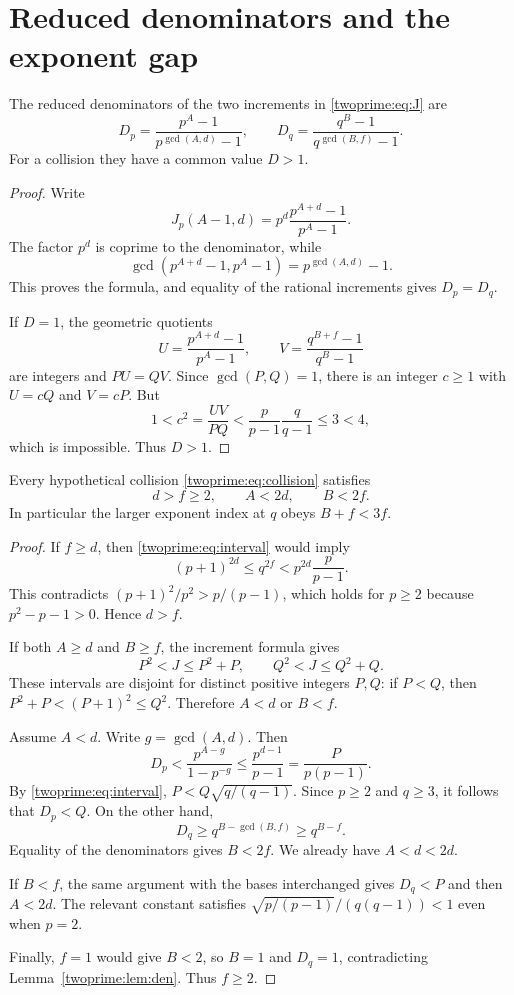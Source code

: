 \section{Reduced denominators and the exponent gap}
\begin{lemma}\label{twoprime:lem:den}
The reduced denominators of the two increments in \eqref{twoprime:eq:J} are
\[
 D_p=\frac{p^A-1}{p^{\gcd(A,d)}-1},\qquad
 D_q=\frac{q^B-1}{q^{\gcd(B,f)}-1}.
\]
For a collision they have a common value $D>1$.
\end{lemma}
\begin{proof}
Write
\[
 J_p(A-1,d)=p^d\frac{p^{A+d}-1}{p^A-1}.
\]
The factor $p^d$ is coprime to the denominator, while
\[
 \gcd(p^{A+d}-1,p^A-1)=p^{\gcd(A,d)}-1.
\]
This proves the formula, and equality of the rational increments gives $D_p=D_q$.

If $D=1$, the geometric quotients
\[
 U=\frac{p^{A+d}-1}{p^A-1},\qquad
 V=\frac{q^{B+f}-1}{q^B-1}
\]
are integers and $PU=QV$. Since $\gcd(P,Q)=1$, there is an integer $c\ge1$ with $U=cQ$ and $V=cP$. But
\[
 1<c^2=\frac{UV}{PQ}
 <\frac p{p-1}\frac q{q-1}\le3<4,
\]
which is impossible. Thus $D>1$.
\end{proof}

\begin{lemma}\label{twoprime:lem:gap}
Every hypothetical collision \eqref{twoprime:eq:collision} satisfies
\[
 \boxed{d>f\ge2,\qquad A<2d,\qquad B<2f.}
\]
In particular the larger exponent index at $q$ obeys $B+f<3f$.
\end{lemma}
\begin{proof}
If $f\ge d$, then \eqref{twoprime:eq:interval} would imply
\[
 (p+1)^{2d}\le q^{2f}<p^{2d}\frac p{p-1}.
\]
This contradicts $(p+1)^2/p^2>p/(p-1)$, which holds for $p\ge2$ because $p^2-p-1>0$. Hence $d>f$.

If both $A\ge d$ and $B\ge f$, the increment formula gives
\[
 P^2<J\le P^2+P,\qquad Q^2<J\le Q^2+Q.
\]
These intervals are disjoint for distinct positive integers $P,Q$: if $P<Q$, then $P^2+P<(P+1)^2\le Q^2$. Therefore $A<d$ or $B<f$.

Assume $A<d$. Write $g=\gcd(A,d)$. Then
\[
 D_p<\frac{p^{A-g}}{1-p^{-g}}
 \le\frac{p^{d-1}}{p-1}=\frac{P}{p(p-1)}.
\]
By \eqref{twoprime:eq:interval}, $P<Q\sqrt{q/(q-1)}$. Since $p\ge2$ and $q\ge3$, it follows that $D_p<Q$. On the other hand,
\[
 D_q\ge q^{B-\gcd(B,f)}\ge q^{B-f}.
\]
Equality of the denominators gives $B<2f$. We already have $A<d<2d$.

If $B<f$, the same argument with the bases interchanged gives $D_q<P$ and then $A<2d$. The relevant constant satisfies $\sqrt{p/(p-1)}/(q(q-1))<1$ even when $p=2$.

Finally, $f=1$ would give $B<2$, so $B=1$ and $D_q=1$, contradicting Lemma~\ref{twoprime:lem:den}. Thus $f\ge2$.
\end{proof}


